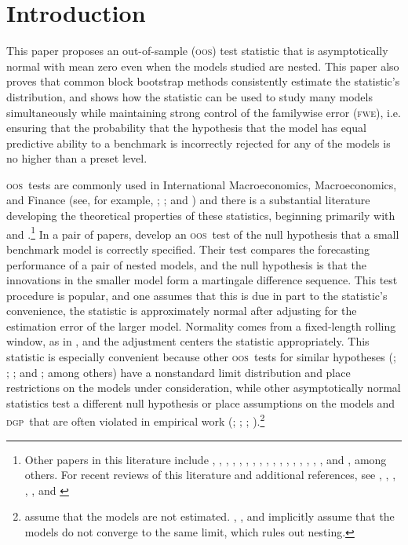 \documentclass[11pt,fleqn]{article}
\theoremstyle{definition}
\newcommand{\dgp}{\textsc{dgp}}
\newcommand{\fwe}{\textsc{fwe}}
\newcommand{\oos}{\textsc{oos}}
\begin{document}
\section{Introduction} This paper proposes an out-of-sample (\oos)
test statistic that is asymptotically normal with mean zero even when
the models studied are nested.  This paper also proves that common
block bootstrap methods consistently estimate the statistic's
distribution, and shows how the statistic can be used to study many
models simultaneously while maintaining strong control of the
familywise error (\fwe), i.e. ensuring that the probability that the
hypothesis that the model has equal predictive ability to a benchmark
is incorrectly rejected for any of the models is no higher than a
preset level.

\oos\ tests are commonly used in International Macroeconomics,
Macroeconomics, and Finance (see, for example, \citealt{MeR:83};
\citealt{StW:03}; and \citealt{GoW:08}) and there is a substantial
literature developing the theoretical properties of these statistics,
beginning primarily with \citet{DiM:95} and
\citet{Wes:96}.\footnote{Other papers in this literature include
  \citet{WeM:98}, \citet{Mcc:98,Mcc:00},
  \citet{ClM:01,ClM:05-2,ClM:05,ClM:11b,ClM:12,ClM:12b},
  \citet{CCS:01}, \citet{CoS:02,CoS:04,CoS:07}, \citet{Whi:00},
  \citet{InK:04,InK:06}, \citet{Han:05}, \citet{Ros:05},
  \citet{ClW:06,ClW:07}, \citet{Ana:07}, \citet{GiR:09,GiR:10},
  \citet{HuW:10}, \citet{HLN:11}, \cite{InR:11}, \cite{Pin:11},
  \cite{RoS:11,RoS:11b}, and \citet{Cal:11}, among others.  For recent
  reviews of this literature and additional references, see
  \citet{McW:02}, \citet{CoS:06}, \citet{Wes:06}, \citet{ClM:11c},
  \citet{CoD:11}, and \citet{Gia:11}} In a pair of papers,
\citet{ClW:06,ClW:07} develop an \oos\ test of the null hypothesis
that a small benchmark model is correctly specified.  Their test
compares the forecasting performance of a pair of nested models, and
the null hypothesis is that the innovations in the smaller model form
a martingale difference sequence.  This test procedure is popular, and
one assumes that this is due in part to the statistic's convenience,
the statistic is approximately normal after adjusting for the
estimation error of the larger model.  Normality comes from a
fixed-length rolling window, as in \citet{GiW:06}, and the adjustment
centers the statistic appropriately.  This statistic is especially
convenient because other \oos\ tests for similar hypotheses
(\citealt{CCS:01}; \citealt{ClM:01,ClM:05}; \citealt{CoS:02,CoS:04};
and \citealt{Mcc:07}; among others) have a nonstandard limit
distribution and place restrictions on the models under consideration,
while other asymptotically normal statistics test a different null
hypothesis \citep{GiW:06} or place assumptions on the models and \dgp\
that are often violated in empirical work (\citealt{DiM:95};
\citealt{Wes:96}; \citealt{WeM:98};
\citealt{Mcc:00}).\footnote{\citet{DiM:95} assume that the models are
  not estimated. \citet{Wes:96}, \citet{WeM:98}, and \citet{Mcc:00}
  implicitly assume that the models do not converge to the same limit,
  which rules out nesting.}
\end{document}
